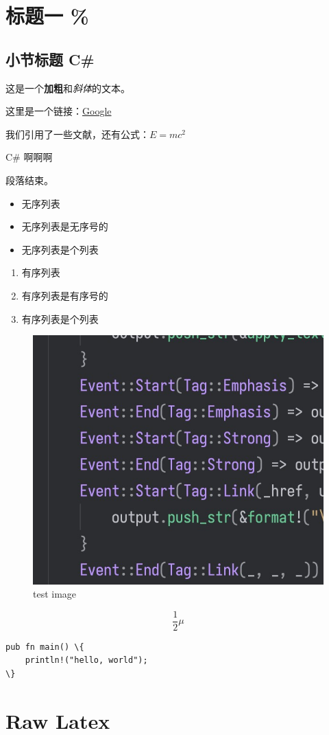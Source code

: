 \chapter{标题一 {\%}}
\section{小节标题 C\#}
这是一个\textbf{加粗}和\textit{斜体}的文本。

这里是一个链接：\href{https://www.google.com}{Google}

我们引用了一些文献\cite{foo}，还有公式：$E = mc^2$

C\# 啊啊啊

段落结束。

\begin{itemize}
\item 无序列表
\item 无序列表是无序号的
\item 无序列表是个列表
\end{itemize}
\begin{enumerate}
\item 有序列表
\item 有序列表是有序号的
\item 有序列表是个列表
\end{enumerate}
\begin{figure}[h]
\includegraphics{images/test.jpg}
\caption{test image}
\label{fig:images/test.jpg}
\end{figure}


\begin{equation}
\frac{1}{2}\mu
\label{eq:hhhhh}
\end{equation}

\begin{lstlisting}
pub fn main() \{
    println!("hello, world");
\}
\end{lstlisting}
\chapter{Raw Latex}
